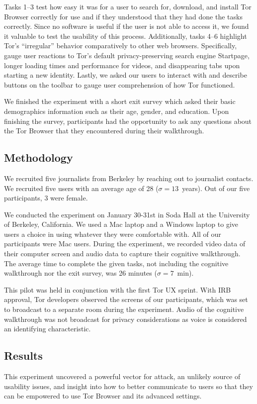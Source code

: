 \documentclass[letterpaper,twocolumn,11pt]{article}
\begin{document}
Tasks 1--3 test how easy it was for a user to search for, download, and install Tor Browser 
correctly for use and if they understood that they had done the tasks correctly. 
Since no software is useful if the user is not able to access it, we found it valuable
to test the usability of this process.  Additionally, tasks 4--6 highlight Tor's ``irregular'' behavior 
comparatively to other web browsers. Specifically, gauge user reactions to Tor's default
privacy-preserving search engine Startpage,  longer loading times and performance for videos, 
and disappearing tabs upon starting a new identity. Lastly, we asked our users to 
interact with and describe buttons on the toolbar to gauge user comprehension of how Tor functioned.

We finished the experiment with a short exit survey which asked their basic demographics information 
such as their age, gender, and education. Upon finishing the survey, participants had the opportunity to 
ask any questions about the Tor Browser that they encountered during their walkthrough. 

\subsection{Methodology} 
\indent \indent We recruited five journalists from Berkeley by reaching out to journalist contacts.
 We recruited five users with an average age of 28 ($\sigma = 13 $~years). Out of 
our five participants, 3 were female. 

We conducted the experiment on January 30-31st in Soda 
Hall at the University of Berkeley, California. We used a Mac laptop and a 
Windows laptop to give users a choice in using whatever they were comfortable with. 
All of our participants were Mac users. During the experiment, 
we recorded video data of their computer screen and audio data to capture their cognitive walkthrough. 
The average time to complete the given tasks, not including the cognitive
walkthrough nor the exit survey, was 26 minutes ($\sigma = 7$~min). 

This pilot was held in conjunction with the first Tor UX sprint. With IRB approval, Tor developers
observed the screens of our participants, which was set to broadcast to a separate  
room during the experiment. Audio of the cognitive walkthrough was not broadcast for privacy
considerations as voice is considered an identifying characteristic.

\subsection{Results}
\indent \indent This experiment uncovered a powerful vector for attack, an unlikely source
of usability issues, and insight into how to better communicate to users so that they can be 
empowered to use Tor Browser and its advanced settings. 
\end{document}
